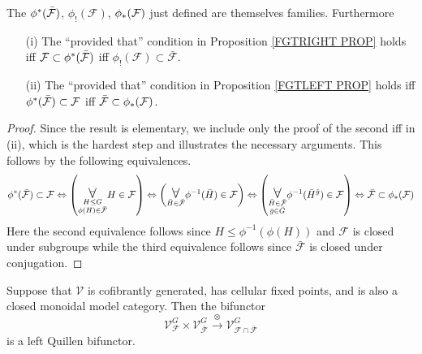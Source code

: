 \documentclass[a4paper,10pt]{article}%
\begin{document}
\begin{lemma}\label{REWORFAM LEM}
The $\phi^{\**}(\bar{\mathcal{F}})$, $\phi_{!}(\mathcal{F})$, $\phi_{\**}(\mathcal{F})$ just defined are 
themselves families. Furthermore
\begin{itemize}
\item[(i)] The ``provided that'' condition in Proposition \ref{FGTRIGHT PROP} holds iff 
$\mathcal{F} \subset \phi^{\**} (\bar{\mathcal{F}})$
iff
$\phi_{!}(\mathcal{F}) \subset \bar{\mathcal{F}}$.
\item [(ii)]
The ``provided that'' condition in Proposition \ref{FGTLEFT PROP} holds iff 
$\phi^{\**} (\bar{\mathcal{F}}) \subset \mathcal{F}$
iff
$\bar{\mathcal{F}} \subset \phi_{\**}(\mathcal{F})$.
\end{itemize}
\end{lemma}


\begin{proof}
	Since the result is elementary, we include only the proof of the second iff in (ii), which is the hardest step and illustrates the necessary arguments. This follows by the following equivalences.
\[
	\phi^{\**} (\bar{\mathcal{F}}) \subset \mathcal{F}
\Leftrightarrow
	\left( \underset{ \substack{H \leq G \\ \phi(H) \in \bar{\mathcal{F}} }}{\mathlarger{\mathlarger{\forall}}} 
	H \in \mathcal{F} \right)
\Leftrightarrow
	\left( \underset{\bar{H} \in \bar{\mathcal{F}}}{\mathlarger{\mathlarger{\forall}}}
	\phi^{-1}(\bar{H}) \in \mathcal{F}
	\right)
\Leftrightarrow
	\left( \underset{ \substack{\bar{H} \in \bar{\mathcal{F}}\\\bar{g} \in \bar{G}}}{\mathlarger{\mathlarger{\forall}}}
	\phi^{-1}(\bar{H}^{\bar{g}}) \in \mathcal{F}
	\right)
\Leftrightarrow
        \bar{\mathcal F} \subset \phi_{\**}(\mathcal F)
\]
Here the second equivalence follows since 
$H \leq \phi^{-1}(\phi(H))$ and $\mathcal{F}$ is closed under subgroups while the third equivalence follows since 
$\bar{\mathcal{F}}$ is closed under conjugation. 
\end{proof}


\begin{proposition}\label{BIQUILLENG PROP}
	Suppose that $\mathcal{V}$ is cofibrantly generated, has cellular fixed points, and is also a closed monoidal model category. 	
	Then the bifunctor
\[
	\mathcal{V}^G_{\mathcal{F}}
		\times
	\mathcal{V}^G_{\bar{\mathcal{F}}}
		\xrightarrow{\otimes}
	\mathcal{V}^G_{\mathcal{F} \cap \bar{\mathcal{F}}}
\]
	is a left Quillen bifunctor.
\end{proposition}
\end{document}
